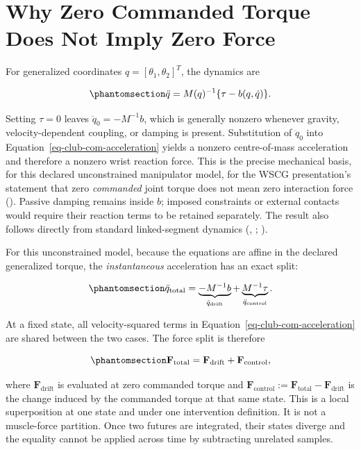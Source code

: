 \documentclass[
  letterpaper,
]{report}
\begin{document}
\section{Why Zero Commanded Torque Does Not Imply Zero
Force}\label{sec-zero-torque-force}

For generalized coordinates \(q=[\theta_1,\theta_2]^T\), the dynamics
are

\begin{equation}\phantomsection\label{eq-force-dynamics}{
\ddot q=M(q)^{-1}\{\tau-b(q,\dot q)\}.
}\end{equation}

Setting \(\tau=0\) leaves \(\ddot q_{0}=-M^{-1}b\), which is generally
nonzero whenever gravity, velocity-dependent coupling, or damping is
present. Substitution of \(\ddot q_0\) into
Equation~\ref{eq-club-com-acceleration} yields a nonzero centre-of-mass
acceleration and therefore a nonzero wrist reaction force. This is the
precise mechanical basis, for this declared unconstrained manipulator
model, for the WSCG presentation's statement that zero \emph{commanded}
joint torque does not mean zero interaction force
(). Passive damping remains
inside \(b\); imposed constraints or external contacts would require
their reaction terms to be retained separately. The result also follows
directly from standard linked-segment dynamics
(,
;
).

For this unconstrained model, because the equations are affine in the
declared generalized torque, the \emph{instantaneous} acceleration has
an exact split:

\begin{equation}\phantomsection\label{eq-force-affine-split}{
\ddot q_{\mathrm{total}}
=\underbrace{-M^{-1}b}_{\ddot q_{\mathrm{drift}}}
+\underbrace{M^{-1}\tau}_{\ddot q_{\mathrm{control}}}.
}\end{equation}

At a fixed state, all velocity-squared terms in
Equation~\ref{eq-club-com-acceleration} are shared between the two
cases. The force split is therefore

\begin{equation}\phantomsection\label{eq-force-superposition}{
\mathbf F_{\mathrm{total}}
=\mathbf F_{\mathrm{drift}}+\mathbf F_{\mathrm{control}},
}\end{equation}

where \(\mathbf F_{\mathrm{drift}}\) is evaluated at zero commanded
torque and \(\mathbf F_{\mathrm{control}}:=\mathbf F_{\mathrm{total}}-
\mathbf F_{\mathrm{drift}}\) is the change induced by the commanded
torque at that same state. This is a local superposition at one state
and under one intervention definition. It is not a muscle-force
partition. Once two futures are integrated, their states diverge and the
equality cannot be applied across time by subtracting unrelated samples.
\end{document}
